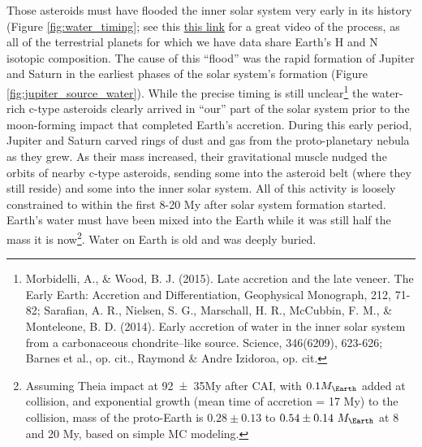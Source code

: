 \documentclass[amstex,12pt]{book}
\begin{document}
{Those asteroids must have flooded the inner solar system very early in its history (Figure \ref{fig:water_timing}; see this \href{https://www.youtube.com/watch?v=Ji5ZC7CP5to}{this link} for a great video of the process, as all of the terrestrial planets for which we have data share Earth's H and N isotopic composition. The cause of this ``flood'' was the rapid formation of Jupiter and Saturn in the earliest phases of the solar system's formation (Figure \ref{fig:jupiter_source_water}). While the precise timing is still unclear\footnote{Morbidelli, A., \& Wood, B. J. (2015). Late accretion and the late veneer. The Early Earth: Accretion and Differentiation, Geophysical Monograph, 212, 71-82; Sarafian, A. R., Nielsen, S. G., Marschall, H. R., McCubbin, F. M., \& Monteleone, B. D. (2014). Early accretion of water in the inner solar system from a carbonaceous chondrite–like source. Science, 346(6209), 623-626; Barnes et al., op. cit., Raymond \& Andre Izidoroa, op. cit.} the water-rich c-type asteroids clearly arrived in ``our'' part of the solar system prior to the moon-forming impact that completed Earth's accretion. During this early period, Jupiter and Saturn carved rings of dust and gas from the proto-planetary nebula as they grew. As their mass increased, their gravitational muscle nudged the orbits of nearby c-type asteroids, sending some into the asteroid belt (where they still reside) and some into the inner solar system. All of this activity is loosely constrained to within the first 8-20 My after solar system formation started. Earth's water must have been mixed into the Earth while it was still half the mass it is now\footnote{Assuming Theia impact at \num[separate-uncertainty = true]{92(35)}My after CAI, with $0.1M_\Earth$ added at collision, and exponential growth (mean time of accretion = 17 My) to the collision, mass of the proto-Earth is $0.28\pm 0.13$ to $0.54\pm 0.14\  M_\Earth$ at 8 and 20 My, based on simple MC modeling.}. Water on Earth is old and was deeply buried.\\
 
  
}
\end{document}
